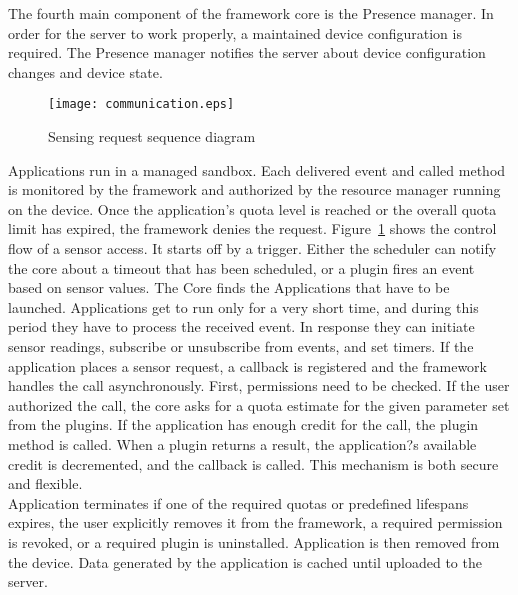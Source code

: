 \documentclass[conference,letterpaper]{IEEEtran}
\begin{document}
\indent The fourth main component of the framework core is the Presence manager. In order for the server to work properly, a maintained device configuration is required. The Presence manager notifies the server about device configuration changes and  device state.
\begin{figure}[h]
\centering
	\texttt{[image: communication.eps]}
	\label{fig:communicationImage}
\caption{Sensing request sequence diagram}
\end{figure}
Applications run in a managed sandbox. Each delivered event and called method is monitored by the framework and authorized by the resource manager running on the device. Once the application's quota level is reached or the overall quota limit has expired, the framework denies the request. Figure~\ref{fig:communicationImage} shows the control flow of a sensor access. It starts off by a trigger. Either the scheduler can notify the core about a timeout that has been scheduled, or a plugin fires an event based on sensor values. The Core finds the Applications that have to be launched. Applications get to run only for a very short time, and during this period they have to process the received event. In response they can initiate sensor readings, subscribe or unsubscribe from events, and set timers. If the application places a sensor request, a callback is registered and the framework handles the call asynchronously. First, permissions need to be checked. If the user authorized the call, the core asks for a quota estimate for the given parameter set from the plugins. If the application has enough credit for the call, the plugin method is called. When a plugin returns a result, the application?s available credit is decremented, and the callback is called. This mechanism is both secure and flexible.\\
\indent Application terminates if one of the required quotas or predefined lifespans expires, the user explicitly removes it from the framework, a required permission is revoked, or a required plugin is uninstalled. Application is then removed from the device. Data generated by the application is cached until uploaded to the server.
\end{document}
